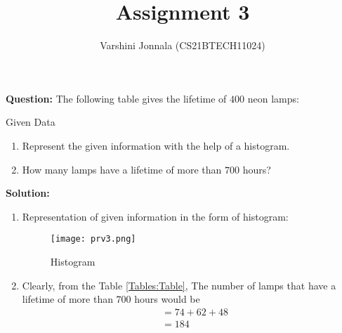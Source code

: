 \documentclass[journal,12pt,twocolumn]{IEEEtran}
\title{Assignment 3}
\author{Varshini Jonnala (CS21BTECH11024)}
\newcommand{\question}{\noindent \textbf{Question: }}
\newcommand{\solution}{\noindent \textbf{Solution: }}
\begin{document}
    \maketitle
    \question
    The following table gives the lifetime of $400$ neon lamps:
    \begin{table}[ht!]
            
        \caption{Given Data}
	        \label{Tables:Table}
    \end{table}
    \begin{enumerate}[label=(\roman*)]
		\item Represent the given information with the help of a histogram.
		\item How many lamps have a lifetime of more than $700$ hours?
    \end{enumerate}
    \solution 
     \begin{enumerate}[label=(\roman*)]
         \item Representation of given information in the form of histogram:
         \begin{figure}[!ht]
		    \centering
		    \texttt{[image: prv3.png]}
		    \caption{Histogram}
        \label{fig:fig-1}
    	\end{figure}
	
         \item Clearly, from the Table \ref{Tables:Table}, The number of lamps that have a lifetime of more than $700$ hours would be 
         \begin{align}
              &= 74 + 62 + 48 \\
              &= 184
         \end{align}
     \end{enumerate}
\end{document}
